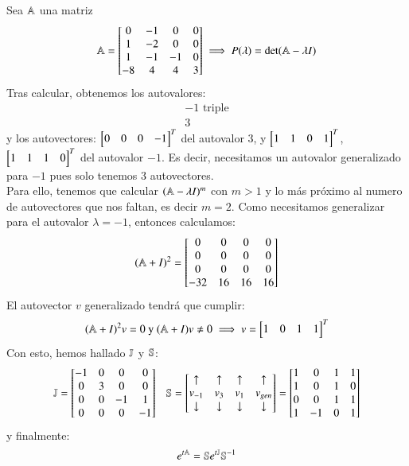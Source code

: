 \begin{eg}
    Sea $\A$ una matriz\\
    $$
        \A = \mx{
                    0 & -1 & 0 & 0\\
                    1 & -2 & 0 & 0\\
                    1 & -1 &-1 & 0\\
                    -8& 4 &  4 & 3
                } \implies P(\lambda) = \det(\A - \lambda I)
    $$
    Tras calcular, obtenemos los autovalores:
    \begin{gather*}
        -1 \text{ triple}\\
        3
    \end{gather*}
    y los autovectores: $\mx{0& 0& 0& -1}^T$ del autovalor $3$, y $\mx{1& 1& 0& 1}^T$, $\mx{1& 1& 1& 0}^T$ del autovalor $-1$. Es decir, necesitamos un autovalor generalizado para $-1$ pues solo tenemos $3$ autovectores.\\
    Para ello, tenemos que calcular $(\A - \lambda I)^m$ con $m > 1$ y lo más próximo al numero de autovectores que nos faltan, es decir $m=2$. Como necesitamos generalizar para el autovalor $\lambda = -1$, entonces calculamos:
    $$
        (\A + I) ^2 = \mx{
                            0 & 0 & 0 & 0\\
                            0 & 0 & 0 & 0\\
                            0 & 0 & 0 & 0\\
                            -32 & 16 & 16 & 16\\
                         }
    $$
    El autovector $v$ generalizado tendrá que cumplir:
    $$
        (\A+I)^2 v = 0 \text{ y } (\A+I)v \neq 0 \implies v = \mx{1 & 0 & 1 & 1}^T
    $$
    Con esto, hemos hallado $\J$ y $\S$:
    $$
        \J = \mx{
                    -1 & 0 & 0 & 0\\
                    0 & 3 & 0 & 0\\
                    0 & 0 & -1 & 1\\
                    0 & 0 & 0 & -1
                }\ \ \ \S = \mx{\uparrow &\uparrow &\uparrow &\uparrow \\v_{-1} & v_{3} & v_{1} & v_{gen}\\ \downarrow & \downarrow & \downarrow & \downarrow} = \mx{1 & 0 & 1 & 1\\
                                                                      1 & 0 & 1 & 0\\
                                                                      0 & 0 & 1 & 1\\
                                                                      1 & -1 & 0 & 1
                                                                        }
    $$
    y finalmente:
    $$
        e^{t\A} = \S e^{t \J} \S^{-1}
    $$
\end{eg}
